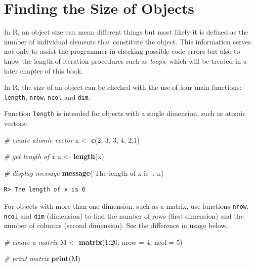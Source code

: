 \documentclass[
  12pt,
]{book}
\newenvironment{Shaded}{\begin{snugshade}}{\end{snugshade}}
\newcommand{\CommentTok}[1]{\textcolor[rgb]{0.37,0.37,0.37}{\textit{#1}}}
\newcommand{\DataTypeTok}[1]{\textcolor[rgb]{0.27,0.27,0.27}{#1}}
\newcommand{\DecValTok}[1]{\textcolor[rgb]{0.06,0.06,0.06}{#1}}
\newcommand{\KeywordTok}[1]{\textcolor[rgb]{0.27,0.27,0.27}{\textbf{#1}}}
\newcommand{\NormalTok}[1]{#1}
\newcommand{\OperatorTok}[1]{\textcolor[rgb]{0.43,0.43,0.43}{\textbf{#1}}}
\newcommand{\StringTok}[1]{\textcolor[rgb]{0.5,0.5,0.5}{#1}}
\begin{document}
\hypertarget{finding-the-size-of-objects}{%
\section{Finding the Size of Objects}\label{finding-the-size-of-objects}}

In R, an object size can mean different things but most likely it is defined as the number of individual elements that constitute the object. This information serves not only to assist the programmer in checking possible code errors but also to know the length of iteration procedures such as \emph{loops}, which will be treated in a later chapter of this book.

In R, the size of an object can be checked with the use of four main functions: \texttt{length}, \texttt{nrow}, \texttt{ncol} and \texttt{dim}.    

Function \texttt{length} is intended for objects with a single dimension, such as atomic vectors:

\begin{Shaded}
\begin{Highlighting}[]
\CommentTok{# create atomic vector}
\NormalTok{x <-}\StringTok{ }\KeywordTok{c}\NormalTok{(}\DecValTok{2}\NormalTok{, }\DecValTok{3}\NormalTok{, }\DecValTok{3}\NormalTok{, }\DecValTok{4}\NormalTok{, }\DecValTok{2}\NormalTok{,}\DecValTok{1}\NormalTok{)}

\CommentTok{# get length of x}
\NormalTok{n <-}\StringTok{ }\KeywordTok{length}\NormalTok{(x)}

\CommentTok{# display message}
\KeywordTok{message}\NormalTok{(}\StringTok{'The length of x is '}\NormalTok{, n)}
\end{Highlighting}
\end{Shaded}

\begin{verbatim}
R> The length of x is 6
\end{verbatim}

For objects with more than one dimension, such as a matrix, use functions \texttt{nrow}, \texttt{ncol} and \texttt{dim} (dimension) to find the number of rows (first dimension) and the number of columns (second dimension). See the difference in usage below.

\begin{Shaded}
\begin{Highlighting}[]
\CommentTok{# create a matrix}
\NormalTok{M <-}\StringTok{ }\KeywordTok{matrix}\NormalTok{(}\DecValTok{1}\OperatorTok{:}\DecValTok{20}\NormalTok{, }\DataTypeTok{nrow =} \DecValTok{4}\NormalTok{, }\DataTypeTok{ncol =} \DecValTok{5}\NormalTok{)}

\CommentTok{# print matrix}
\KeywordTok{print}\NormalTok{(M)}
\end{Highlighting}
\end{Shaded}
\end{document}
